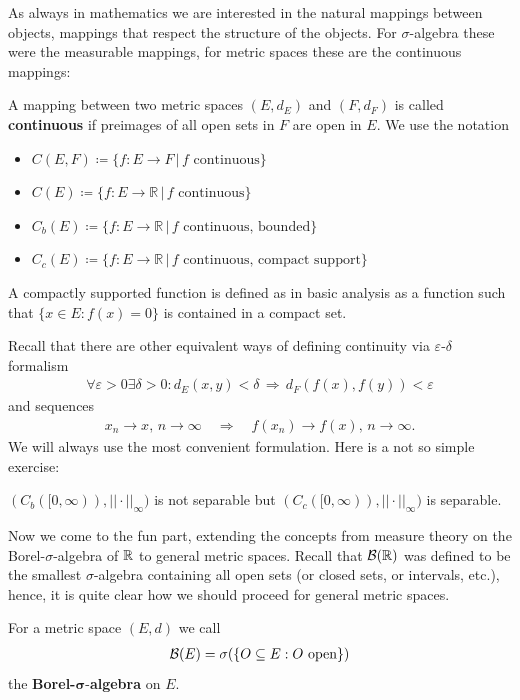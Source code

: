 As always in mathematics we are interested in the natural mappings between objects, mappings that respect the structure of the objects. For $\sigma$-algebra these were the measurable mappings, for metric spaces these are the continuous mappings:
\begin{ldef}
\begin{deff}
	A mapping between two metric spaces $(E,d_E)$ and $(F,d_F)$ is called \textbf{continuous} if preimages of all open sets in $F$ are open in $E$. We use the notation
	\begin{itemize}
		\item $C(E,F)\coloneqq  \{ f\colon E \to F \,|\, f \text{ continuous} \}$
		\item
			$C(E) \coloneqq \{ f\colon E \to \mathbb{R} \,|\, f \text{ continuous} \}$
		\item
			$C_b(E) \coloneqq \{ f\colon E \to \mathbb{R} \,|\, f \text{ continuous, bounded}\}$
		\item
			$C_c(E) \coloneqq \{ f\colon E \to \mathbb{R} \,|\, f \text{ continuous, compact support}\}$
	\end{itemize}
	A compactly supported function is defined as in basic analysis as a function such that $\{x\in E: f(x)=0\}$ is contained in a compact set.
\end{deff}
\end{ldef}
Recall that there are other equivalent ways of defining continuity via $\varepsilon$-$\delta$ formalism
\begin{align*}
	\forall \varepsilon>0 \exists \delta>0: d_E(x,y)<\delta \,\Rightarrow\, d_F(f(x),f(y))<\varepsilon
\end{align*}
and sequences
\begin{align*}
	x_n\to x, \,n\to\infty\quad \Longrightarrow\quad f(x_n)\to f(x), \, n\to\infty.
\end{align*}
We will always use the most convenient formulation. Here is a not so simple exercise:
\begin{luebung}
	$(C_b([0,\infty)), ||\cdot||_\infty)$ is not separable but $(C_c([0,\infty)), ||\cdot||_\infty)$ is separable.
\end{luebung}
Now we come to the fun part, extending the concepts from measure theory on the Borel-$\sigma$-algebra of $\mathbb{R}$ to general metric spaces. Recall that $\mathcal B(\mathbb{R})$ was defined to be the smallest $\sigma$-algebra containing all open sets (or closed sets, or intervals, etc.), hence, it is quite clear how we should proceed for general metric spaces.
\begin{ldef}
\begin{deff}
	For a metric space $(E,d)$ we call 
	\begin{align*}
		\mathcal{B}(E)=\sigma(\{O\subseteq E: O\text{ open}\})
	\end{align*}	
		 the \textbf{Borel-}$\mathbf{\sigma}$-\textbf{algebra} on $E$.
\end{deff}
\end{ldef}
